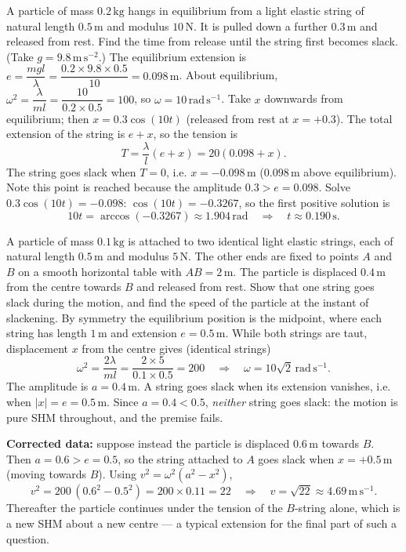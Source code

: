 \documentclass[11pt]{article}
\begin{document}
\begin{exoresolu}
A particle of mass $0.2\,\mathrm{kg}$ hangs in equilibrium from a light elastic string of natural length $0.5\,\mathrm{m}$ and modulus $10\,\mathrm{N}$. It is pulled down a further $0.3\,\mathrm{m}$ and released from rest. Find the time from release until the string first becomes slack. (Take $g = 9.8\,\mathrm{m\,s^{-2}}$.)
\tcblower
The equilibrium extension is $e = \dfrac{mgl}{\lambda} = \dfrac{0.2 \times 9.8 \times 0.5}{10} = 0.098\,\mathrm{m}$.
About equilibrium, $\omega^2 = \dfrac{\lambda}{ml} = \dfrac{10}{0.2 \times 0.5} = 100$, so $\omega = 10\,\mathrm{rad\,s^{-1}}$.
Take $x$ downwards from equilibrium; then $x = 0.3\cos(10t)$ (released from rest at $x = +0.3$).
The total extension of the string is $e + x$, so the tension is
\[
T = \frac{\lambda}{l}(e + x) = 20(0.098 + x).
\]
The string goes slack when $T = 0$, i.e. $x = -0.098\,\mathrm{m}$ ($0.098\,\mathrm{m}$ above equilibrium). Note this point is reached because the amplitude $0.3 > e = 0.098$.
Solve $0.3\cos(10t) = -0.098$: $\cos(10t) = -0.3267$, so the first positive solution is
\[
10t = \arccos(-0.3267) \approx 1.904\,\mathrm{rad} \quad\Rightarrow\quad t \approx 0.190\,\mathrm{s}.
\]
\end{exoresolu}

\begin{exoresolu}
A particle of mass $0.1\,\mathrm{kg}$ is attached to two identical light elastic strings, each of natural length $0.5\,\mathrm{m}$ and modulus $5\,\mathrm{N}$. The other ends are fixed to points $A$ and $B$ on a smooth horizontal table with $AB = 2\,\mathrm{m}$. The particle is displaced $0.4\,\mathrm{m}$ from the centre towards $B$ and released from rest. Show that one string goes slack during the motion, and find the speed of the particle at the instant of slackening.
\tcblower
By symmetry the equilibrium position is the midpoint, where each string has length $1\,\mathrm{m}$ and extension $e = 0.5\,\mathrm{m}$.
While both strings are taut, displacement $x$ from the centre gives (identical strings)
\[
\omega^2 = \frac{2\lambda}{ml} = \frac{2 \times 5}{0.1 \times 0.5} = 200 \quad\Rightarrow\quad \omega = 10\sqrt{2}\,\mathrm{rad\,s^{-1}}.
\]
The amplitude is $a = 0.4\,\mathrm{m}$. A string goes slack when its extension vanishes, i.e. when $|x| = e = 0.5\,\mathrm{m}$. Since $a = 0.4 < 0.5$, \emph{neither} string goes slack: the motion is pure SHM throughout, and the premise fails.
\medskip

\textbf{Corrected data:} suppose instead the particle is displaced $0.6\,\mathrm{m}$ towards $B$. Then $a = 0.6 > e = 0.5$, so the string attached to $A$ goes slack when $x = +0.5\,\mathrm{m}$ (moving towards $B$). Using $v^2 = \omega^2(a^2 - x^2)$,
\[
v^2 = 200\,(0.6^2 - 0.5^2) = 200 \times 0.11 = 22 \quad\Rightarrow\quad v = \sqrt{22} \approx 4.69\,\mathrm{m\,s^{-1}}.
\]
Thereafter the particle continues under the tension of the $B$-string alone, which is a new SHM about a new centre — a typical extension for the final part of such a question.
\end{exoresolu}
\end{document}
